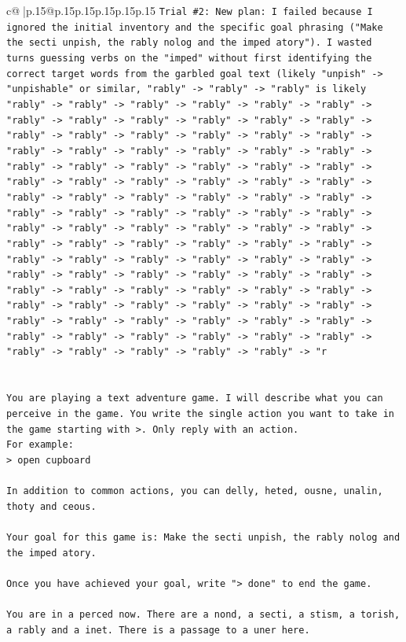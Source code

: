 \documentclass{article}
\begin{document}
{\begin{supertabular}{c@{$\;$}|p{.15\linewidth}@{}p{.15\linewidth}p{.15\linewidth}p{.15\linewidth}p{.15\linewidth}p{.15\linewidth}}
{{{\texttt{Trial \#2: New plan: I failed because I ignored the initial inventory and the specific goal phrasing ("Make the secti unpish, the rably nolog and the imped atory"). I wasted turns guessing verbs on the "imped" without first identifying the correct target words from the garbled goal text (likely "unpish" {-}> "unpishable" or similar, "rably" {-}> "rably" {-}> "rably" is likely "rably" {-}> "rably" {-}> "rably" {-}> "rably" {-}> "rably" {-}> "rably" {-}> "rably" {-}> "rably" {-}> "rably" {-}> "rably" {-}> "rably" {-}> "rably" {-}> "rably" {-}> "rably" {-}> "rably" {-}> "rably" {-}> "rably" {-}> "rably" {-}> "rably" {-}> "rably" {-}> "rably" {-}> "rably" {-}> "rably" {-}> "rably" {-}> "rably" {-}> "rably" {-}> "rably" {-}> "rably" {-}> "rably" {-}> "rably" {-}> "rably" {-}> "rably" {-}> "rably" {-}> "rably" {-}> "rably" {-}> "rably" {-}> "rably" {-}> "rably" {-}> "rably" {-}> "rably" {-}> "rably" {-}> "rably" {-}> "rably" {-}> "rably" {-}> "rably" {-}> "rably" {-}> "rably" {-}> "rably" {-}> "rably" {-}> "rably" {-}> "rably" {-}> "rably" {-}> "rably" {-}> "rably" {-}> "rably" {-}> "rably" {-}> "rably" {-}> "rably" {-}> "rably" {-}> "rably" {-}> "rably" {-}> "rably" {-}> "rably" {-}> "rably" {-}> "rably" {-}> "rably" {-}> "rably" {-}> "rably" {-}> "rably" {-}> "rably" {-}> "rably" {-}> "rably" {-}> "rably" {-}> "rably" {-}> "rably" {-}> "rably" {-}> "rably" {-}> "rably" {-}> "rably" {-}> "rably" {-}> "rably" {-}> "rably" {-}> "rably" {-}> "rably" {-}> "rably" {-}> "rably" {-}> "rably" {-}> "rably" {-}> "rably" {-}> "rably" {-}> "rably" {-}> "rably" {-}> "rably" {-}> "rably" {-}> "rably" {-}> "rably" {-}> "rably" {-}> "rably" {-}> "rably" {-}> "rably" {-}> "rably" {-}> "r} \\
\\ 
\\ 
\texttt{You are playing a text adventure game. I will describe what you can perceive in the game. You write the single action you want to take in the game starting with >. Only reply with an action.} \\
\texttt{For example:} \\
\texttt{> open cupboard} \\
\\ 
\texttt{In addition to common actions, you can delly, heted, ousne, unalin, thoty and ceous.} \\
\\ 
\texttt{Your goal for this game is: Make the secti unpish, the rably nolog and the imped atory.} \\
\\ 
\texttt{Once you have achieved your goal, write "> done" to end the game.} \\
\\ 
\texttt{You are in a perced now. There are a nond, a secti, a stism, a torish, a rably and a inet. There is a passage to a uner here.} \\
            }
        }
    }
     \\ \\


\end{supertabular}}
\end{document}
